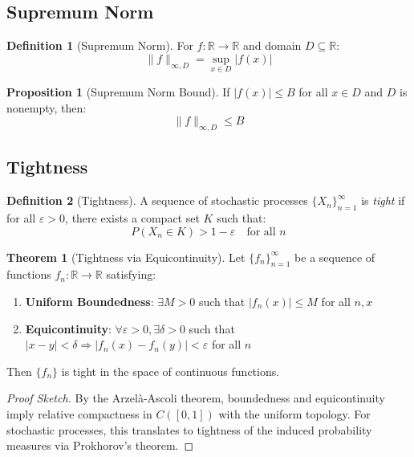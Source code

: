 \documentclass[11pt,a4paper]{article}
\theoremstyle{definition}
\newtheorem{definition}{Definition}[section]
\newtheorem{theorem}{Theorem}[section]
\newtheorem{proposition}{Proposition}[section]
\begin{document}
\subsection{Supremum Norm}

\begin{definition}[Supremum Norm]
For $f: \mathbb{R} \to \mathbb{R}$ and domain $D \subseteq \mathbb{R}$:
\begin{equation}
\|f\|_{\infty, D} = \sup_{x \in D} |f(x)|
\end{equation}
\end{definition}

\begin{proposition}[Supremum Norm Bound]
If $|f(x)| \leq B$ for all $x \in D$ and $D$ is nonempty, then:
\begin{equation}
\|f\|_{\infty, D} \leq B
\end{equation}
\end{proposition}

\subsection{Tightness}

\begin{definition}[Tightness]
A sequence of stochastic processes $\{X_n\}_{n=1}^{\infty}$ is \emph{tight} if for all $\varepsilon > 0$, there exists a compact set $K$ such that:
\begin{equation}
P(X_n \in K) > 1 - \varepsilon \quad \text{for all } n
\end{equation}
\end{definition}

\begin{theorem}[Tightness via Equicontinuity]
Let $\{f_n\}_{n=1}^{\infty}$ be a sequence of functions $f_n: \mathbb{R} \to \mathbb{R}$ satisfying:
\begin{enumerate}
    \item \textbf{Uniform Boundedness}: $\exists M > 0$ such that $|f_n(x)| \leq M$ for all $n, x$
    \item \textbf{Equicontinuity}: $\forall \varepsilon > 0, \exists \delta > 0$ such that $|x - y| < \delta \Rightarrow |f_n(x) - f_n(y)| < \varepsilon$ for all $n$
\end{enumerate}
Then $\{f_n\}$ is tight in the space of continuous functions.
\end{theorem}

\begin{proof}[Proof Sketch]
By the Arzelà-Ascoli theorem, boundedness and equicontinuity imply relative compactness in $C([0,1])$ with the uniform topology. For stochastic processes, this translates to tightness of the induced probability measures via Prokhorov's theorem.
\end{proof}
\end{document}
